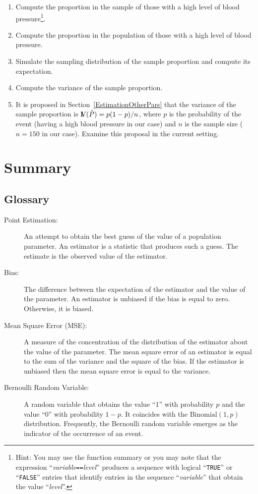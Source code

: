 \documentclass[]{krantz}
\newcommand{\Var}{{\rm I\kern-.3em V}}
\theoremstyle{definition}
\theoremstyle{definition}
\theoremstyle{definition}
\theoremstyle{remark}
\begin{document}
\begin{enumerate}
\def\labelenumi{\arabic{enumi}.}
\item
  Compute the proportion in the sample of those with a high level of
  blood pressure\footnote{Hint: You may use the function summary or you
    may note that the expression
    ``\emph{variable}\texttt{==}\emph{level}'' produces a sequence with
    logical ``\texttt{TRUE}'' or ``\texttt{FALSE}'' entries that
    identify entries in the sequence ``\emph{variable}'' that obtain the
    value ``\emph{level}''.}.
\item
  Compute the proportion in the population of those with a high level of
  blood pressure.
\item
  Simulate the sampling distribution of the sample proportion and
  compute its expectation.
\item
  Compute the variance of the sample proportion.
\item
  It is proposed in Section~\ref{EstimationOtherPars} that the variance
  of the sample proportion is \(\Var(\hat P) = p(1-p)/n\), where \(p\)
  is the probability of the event (having a high blood pressure in our
  case) and \(n\) is the sample size (\(n=150\) in our case). Examine
  this proposal in the current setting.
\end{enumerate}

\section{Summary}\label{summary-8}

\subsection*{Glossary}\label{glossary}


\begin{description}
\item[Point Estimation:]
An attempt to obtain the best guess of the value of a population
parameter. An estimator is a statistic that produces such a guess. The
estimate is the observed value of the estimator.
\item[Bias:]
The difference between the expectation of the estimator and the value of
the parameter. An estimator is unbiased if the bias is equal to zero.
Otherwise, it is biased.
\item[Mean Square Error (MSE):]
A measure of the concentration of the distribution of the estimator
about the value of the parameter. The mean square error of an estimator
is equal to the sum of the variance and the square of the bias. If the
estimator is unbiased then the mean square error is equal to the
variance.
\item[Bernoulli Random Variable:]
A random variable that obtains the value ``1'' with probability \(p\)
and the value ``0'' with probability \(1-p\). It coincides with the
\(\mathrm{Binomial}(1,p)\) distribution. Frequently, the Bernoulli
random variable emerges as the indicator of the occurrence of an event.
\end{description}
\end{document}
